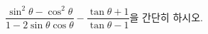 $\dfrac{\sin^{2}\theta-\cos^{2}\theta}{1-2\sin\theta\cos\theta}-\dfrac{\tan\theta+1}{\tan\theta-1}$을 간단히 하시오.
